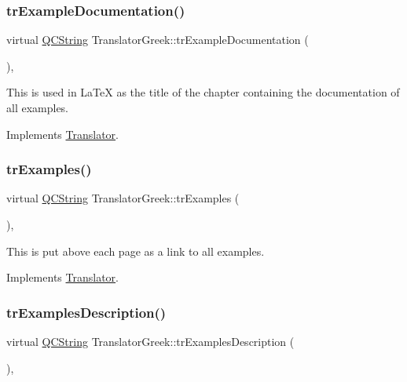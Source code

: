 \subsubsection{\texorpdfstring{trExampleDocumentation()}{trExampleDocumentation()}}
{\footnotesize\ttfamily virtual \mbox{\hyperlink{class_q_c_string}{Q\+C\+String}} Translator\+Greek\+::tr\+Example\+Documentation (\begin{DoxyParamCaption}{ }\end{DoxyParamCaption})\hspace{0.3cm}{\ttfamily [inline]}, {\ttfamily [virtual]}}

This is used in La\+TeX as the title of the chapter containing the documentation of all examples. 

Implements \mbox{\hyperlink{class_translator}{Translator}}.

\mbox{\label{class_translator_greek_a75dd2ea0dc31e3738676cf56d598a479}} 
\subsubsection{\texorpdfstring{trExamples()}{trExamples()}}
{\footnotesize\ttfamily virtual \mbox{\hyperlink{class_q_c_string}{Q\+C\+String}} Translator\+Greek\+::tr\+Examples (\begin{DoxyParamCaption}{ }\end{DoxyParamCaption})\hspace{0.3cm}{\ttfamily [inline]}, {\ttfamily [virtual]}}

This is put above each page as a link to all examples. 

Implements \mbox{\hyperlink{class_translator}{Translator}}.

\mbox{\label{class_translator_greek_a49adb03bcbfb71c475a3668107ab787b}} 
\subsubsection{\texorpdfstring{trExamplesDescription()}{trExamplesDescription()}}
{\footnotesize\ttfamily virtual \mbox{\hyperlink{class_q_c_string}{Q\+C\+String}} Translator\+Greek\+::tr\+Examples\+Description (\begin{DoxyParamCaption}{ }\end{DoxyParamCaption})\hspace{0.3cm}{\ttfamily [inline]}, {\ttfamily [virtual]}}


